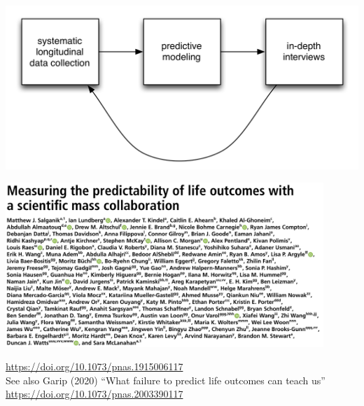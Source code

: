 \documentclass[aspectratio=169]{beamer}
\begin{document}
\begin{frame}

\begin{center}
\includegraphics[width=\textwidth]{figures/kaizen_cycle}
\end{center}

\end{frame}
\begin{frame}

\begin{center}
\includegraphics[width=0.9\textwidth]{figures/salganik_measuring_2020_title_authors}
\end{center}

\vfill
\url{https://doi.org/10.1073/pnas.1915006117}\\
See also Garip (2020) ``What failure to predict life outcomes can teach us'' \url{https://doi.org/10.1073/pnas.2003390117}

\end{frame}
\end{document}
